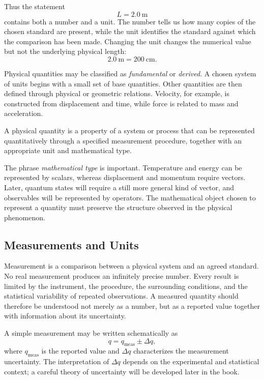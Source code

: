 Thus the statement
\[
L=2.0\ \mathrm{m}
\]
contains both a number and a unit. The number tells us how many copies of the
chosen standard are present, while the unit identifies the standard against
which the comparison has been made. Changing the unit changes the numerical
value but not the underlying physical length:
\[
2.0\ \mathrm{m}=200\ \mathrm{cm}.
\]

Physical quantities may be classified as \emph{fundamental} or \emph{derived}.
A chosen system of units begins with a small set of base quantities. Other
quantities are then defined through physical or geometric relations. Velocity,
for example, is constructed from displacement and time, while force is related
to mass and acceleration.

\begin{bookdefinition}
A physical quantity is a property of a system or process that can be represented
quantitatively through a specified measurement procedure, together with an
appropriate unit and mathematical type.
\end{bookdefinition}

The phrase \emph{mathematical type} is important. Temperature and energy can be
represented by scalars, whereas displacement and momentum require vectors.
Later, quantum states will require a still more general kind of vector, and
observables will be represented by operators. The mathematical object chosen to
represent a quantity must preserve the structure observed in the physical
phenomenon.

\subsection{Measurements and Units}
\label{subsec:measurements-and-units}

Measurement is a comparison between a physical system and an agreed standard.
No real measurement produces an infinitely precise number. Every result is
limited by the instrument, the procedure, the surrounding conditions, and the
statistical variability of repeated observations. A measured quantity should
therefore be understood not merely as a number, but as a reported value together
with information about its uncertainty.

A simple measurement may be written schematically as
\[
q=q_{\mathrm{meas}}\pm\Delta q,
\]
where $q_{\mathrm{meas}}$ is the reported value and $\Delta q$ characterizes the
measurement uncertainty. The interpretation of $\Delta q$ depends on the
experimental and statistical context; a careful theory of uncertainty will be
developed later in the book.

